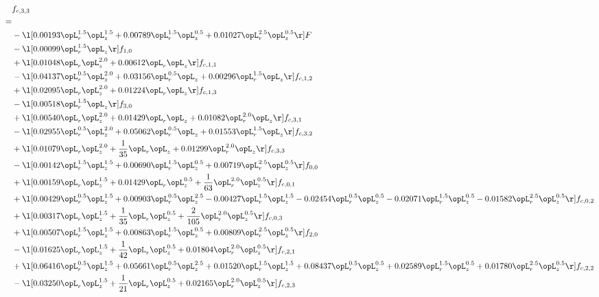 \begin{alignat}{2} 
\label{eq:f_33_1} 
& f_{c,3,3} \nonumber \\ 
 = \\ 
& - \l[  0.00193 \opL_r^{1.5} \opL_z^{1.5} +  0.00789 \opL_r^{1.5} \opL_z^{0.5} +  0.01027 \opL_r^{2.5} \opL_z^{0.5}  \r] F \nonumber \\ 
& - \l[  0.00099 \opL_r^{1.5} \opL_z  \r] f_{1,0} \nonumber \\ 
& + \l[  0.01048 \opL_r \opL_z^{2.0} +  0.00612 \opL_r \opL_z  \r] f_{c,1,1} \nonumber \\ 
& - \l[  0.04137 \opL_r^{0.5} \opL_z^{2.0} +  0.03156 \opL_r^{0.5} \opL_z +  0.00296 \opL_r^{1.5} \opL_z  \r] f_{c,1,2} \nonumber \\ 
& + \l[  0.02095 \opL_r \opL_z^{2.0} +  0.01224 \opL_r \opL_z  \r] f_{c,1,3} \nonumber \\ 
& - \l[  0.00518 \opL_r^{1.5} \opL_z  \r] f_{3,0} \nonumber \\ 
& + \l[  0.00540 \opL_r \opL_z^{2.0} +  0.01429 \opL_r \opL_z +  0.01082 \opL_r^{2.0} \opL_z  \r] f_{c,3,1} \nonumber \\ 
& - \l[  0.02955 \opL_r^{0.5} \opL_z^{2.0} +  0.05062 \opL_r^{0.5} \opL_z +  0.01553 \opL_r^{1.5} \opL_z  \r] f_{c,3,2} \nonumber \\ 
& + \l[  0.01079 \opL_r \opL_z^{2.0} + \frac{1}{35} \opL_r \opL_z +  0.01299 \opL_r^{2.0} \opL_z  \r] f_{c,3,3} \nonumber \\ 
& - \l[  0.00142 \opL_r^{1.5} \opL_z^{1.5} +  0.00690 \opL_r^{1.5} \opL_z^{0.5} +  0.00719 \opL_r^{2.5} \opL_z^{0.5}  \r] f_{0,0} \nonumber \\ 
& + \l[  0.00159 \opL_r \opL_z^{1.5} +  0.01429 \opL_r \opL_z^{0.5} + \frac{1}{63} \opL_r^{2.0} \opL_z^{0.5}  \r] f_{c,0,1} \nonumber \\ 
& + \l[  0.00429 \opL_r^{0.5} \opL_z^{1.5} +  0.00903 \opL_r^{0.5} \opL_z^{2.5}   -0.00427 \opL_r^{1.5} \opL_z^{1.5}   -0.02454 \opL_r^{0.5} \opL_z^{0.5}   -0.02071 \opL_r^{1.5} \opL_z^{0.5}   -0.01582 \opL_r^{2.5} \opL_z^{0.5}  \r] f_{c,0,2} \nonumber \\ 
& + \l[  0.00317 \opL_r \opL_z^{1.5} + \frac{1}{35} \opL_r \opL_z^{0.5} + \frac{2}{105} \opL_r^{2.0} \opL_z^{0.5}  \r] f_{c,0,3} \nonumber \\ 
& + \l[  0.00507 \opL_r^{1.5} \opL_z^{1.5} +  0.00863 \opL_r^{1.5} \opL_z^{0.5} +  0.00809 \opL_r^{2.5} \opL_z^{0.5}  \r] f_{2,0} \nonumber \\ 
& - \l[  0.01625 \opL_r \opL_z^{1.5} + \frac{1}{42} \opL_r \opL_z^{0.5} +  0.01804 \opL_r^{2.0} \opL_z^{0.5}  \r] f_{c,2,1} \nonumber \\ 
& + \l[  0.06416 \opL_r^{0.5} \opL_z^{1.5} +  0.05661 \opL_r^{0.5} \opL_z^{2.5} +  0.01520 \opL_r^{1.5} \opL_z^{1.5} +  0.08437 \opL_r^{0.5} \opL_z^{0.5} +  0.02589 \opL_r^{1.5} \opL_z^{0.5} +  0.01780 \opL_r^{2.5} \opL_z^{0.5}  \r] f_{c,2,2} \nonumber \\ 
& - \l[  0.03250 \opL_r \opL_z^{1.5} + \frac{1}{21} \opL_r \opL_z^{0.5} +  0.02165 \opL_r^{2.0} \opL_z^{0.5}  \r] f_{c,2,3} \nonumber \\ 
\end{alignat} 



